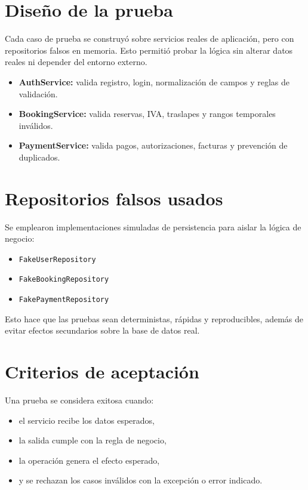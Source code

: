 \documentclass[11pt,a4paper]{report}
\begin{document}
\section{Diseño de la prueba}

Cada caso de prueba se construyó sobre servicios reales de aplicación, pero con repositorios falsos en memoria. Esto permitió probar la lógica sin alterar datos reales ni depender del entorno externo.

\begin{itemize}[leftmargin=1.5em,itemsep=0.4em]
    \item \textbf{AuthService:} valida registro, login, normalización de campos y reglas de validación.
    \item \textbf{BookingService:} valida reservas, IVA, traslapes y rangos temporales inválidos.
    \item \textbf{PaymentService:} valida pagos, autorizaciones, facturas y prevención de duplicados.
\end{itemize}

\section{Repositorios falsos usados}

Se emplearon implementaciones simuladas de persistencia para aislar la lógica de negocio:

\begin{itemize}[leftmargin=1.5em,itemsep=0.4em]
    \item \texttt{FakeUserRepository}
    \item \texttt{FakeBookingRepository}
    \item \texttt{FakePaymentRepository}
\end{itemize}

Esto hace que las pruebas sean deterministas, rápidas y reproducibles, además de evitar efectos secundarios sobre la base de datos real.

\section{Criterios de aceptación}

Una prueba se considera exitosa cuando:

\begin{itemize}[leftmargin=1.5em,itemsep=0.4em]
    \item el servicio recibe los datos esperados,
    \item la salida cumple con la regla de negocio,
    \item la operación genera el efecto esperado,
    \item y se rechazan los casos inválidos con la excepción o error indicado.
\end{itemize}
\end{document}
